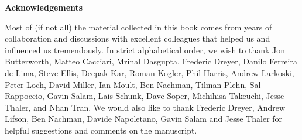 \centerline{\bf Acknowledgements}
\vspace*{0.5cm}

Most of (if not all) the material collected in this book comes from years of collaboration and discussions with excellent colleagues that helped us and influenced us tremendously. In strict alphabetical order, we wish to thank %
Jon Butterworth,
Matteo Cacciari,
Mrinal Dasgupta,
Frederic Dreyer,
Danilo Ferreira de Lima,
Steve Ellis,
Deepak Kar,
Roman Kogler,
Phil Harris,
Andrew Larkoski,
Peter Loch,
David Miller,
Ian Moult,
Ben Nachman,
Tilman Plehn,
Sal Rappoccio,
Gavin Salam,
Lais Schunk,
Dave Soper,
Michihisa Takeuchi,
Jesse Thaler, and
Nhan Tran.
%
We would also like to thank Frederic Dreyer, Andrew Lifson, Ben
Nachman, Davide Napoletano, Gavin Salam and Jesse Thaler for helpful suggestions and
comments on the manuscript.


